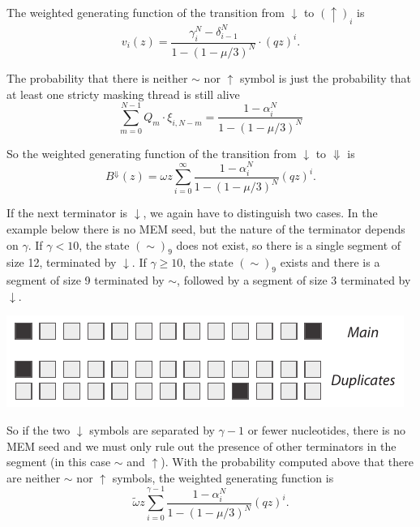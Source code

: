 \documentclass{article}
\newenvironment{inset}
{\vspace{0.5\baselineskip}\begin{center}}
{\end{center}\vspace{0.5\baselineskip}}
\begin{document}
The weighted generating function of the transition from $\downarrow$ to
$(\uparrow)_i$ is
\begin{equation}
v_i(z) = \frac{\gamma_i^N- \delta_{i-1}^N}{1-(1-\mu/3)^N} \cdot (qz)^i.
\end{equation}


The probability that there is neither $\sim$ nor $\uparrow$ symbol is just
the probability that at least one stricty masking thread is still alive
\begin{equation}
\sum_{m=0}^{N-1}Q_m \cdot \xi_{i,N-m} = \frac{1-\alpha_i^N}{1-(1-\mu/3)^N}
\end{equation}

So the weighted generating function of the transition from $\downarrow$ to
$\Downarrow$ is
\begin{equation}
B^\Downarrow(z) = \omega z\sum_{i=0}^\infty
\frac{1-\alpha_i^N}{1-(1-\mu/3)^N} (qz)^i.
\end{equation}

If the next terminator is $\downarrow$, we again have to distinguish two
cases. In the example below there is no MEM seed, but the nature of the
terminator depends on $\gamma$. If $\gamma < 10$, the state $(\sim)_9$
does not exist, so there is a single segment of size 12, terminated by
$\downarrow$. If $\gamma \geq 10$, the state $(\sim)_9$ exists and there
is a segment of size 9 terminated by $\sim$, followed by a segment of size
3 terminated by $\downarrow$.
\begin{inset}
\includegraphics[scale=.9]{down_to_down_case_1.pdf}
\end{inset}

So if the two $\downarrow$ symbols are separated by $\gamma-1$ or fewer
nucleotides, there is no MEM seed and we must only rule out the presence
of other terminators in the segment (in this case $\sim$ and $\uparrow$).
With the probability computed above that there are neither $\sim$ nor
$\uparrow$ symbols, the weighted generating function is
\begin{equation}
\tilde{\omega} z\sum_{i=0}^{\gamma-1}
\frac{1-\alpha_i^N}{1-(1-\mu/3)^N} (qz)^i.
\end{equation}
\end{document}
